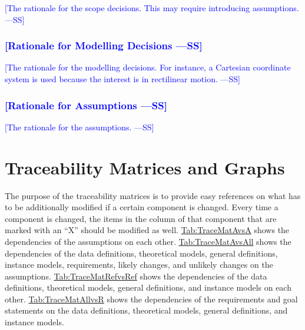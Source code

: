 \documentclass[12pt]{article}
\newcommand{\authornote}[3]{\textcolor{#1}{[#3 ---#2]}}
\newcommand{\authornote}[3]{}
\newcommand{\wss}[1]{\authornote{blue}{SS}{#1}}
\begin{document}
\wss{The rationale for the scope decisions.  This may require introducing
assumptions.}

\subsubsection{\wss{Rationale for Modelling Decisions}}

\wss{The rationale for the modelling decisions. For instance, a Cartesian
coordinate system is used because the interest is in rectilinear motion.}

\subsubsection{\wss{Rationale for Assumptions}}

\wss{The rationale for the assumptions.}

\section{Traceability Matrices and Graphs}
\label{Sec:TraceMatrices}
The purpose of the traceability matrices is to provide easy references on what has to be additionally modified if a certain component is changed. Every time a component is changed, the items in the column of that component that are marked with an ``X'' should be modified as well. \hyperref[Table:TraceMatAvsA]{Tab:TraceMatAvsA} shows the dependencies of the assumptions on each other. \hyperref[Table:TraceMatAvsAll]{Tab:TraceMatAvsAll} shows the dependencies of the data definitions, theoretical models, general definitions, instance models, requirements, likely changes, and unlikely changes on the assumptions. \hyperref[Table:TraceMatRefvsRef]{Tab:TraceMatRefvsRef} shows the dependencies of the data definitions, theoretical models, general definitions, and instance models on each other. \hyperref[Table:TraceMatAllvsR]{Tab:TraceMatAllvsR} shows the dependencies of the requirements and goal statements on the data definitions, theoretical models, general definitions, and instance models.
\end{document}
